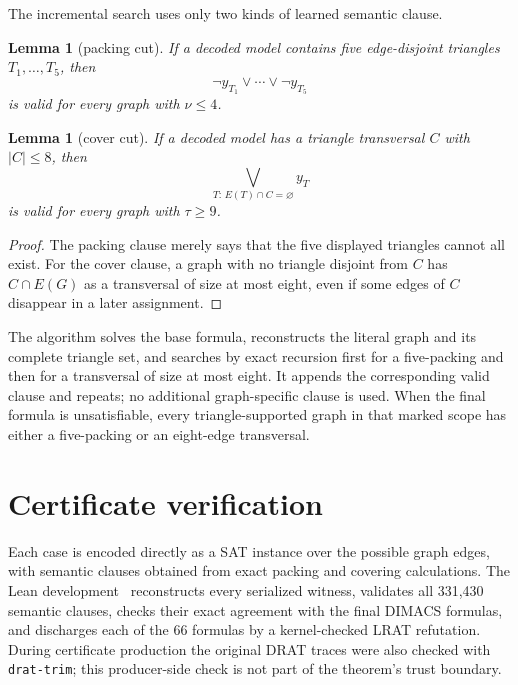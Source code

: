 \documentclass[11pt]{article}
\newtheorem{lemma}[theorem]{Lemma}
\theoremstyle{definition}
\begin{document}
The incremental search uses only two kinds of learned semantic clause.

\begin{lemma}[packing cut]\label{lem:packing-cut}
If a decoded model contains five edge-disjoint triangles
$T_1,\ldots,T_5$, then
\[
  \neg y_{T_1}\vee\cdots\vee\neg y_{T_5}
\]
is valid for every graph with $\nu\leq4$.
\end{lemma}

\begin{lemma}[cover cut]\label{lem:cover-cut}
If a decoded model has a triangle transversal $C$ with $|C|\leq8$, then
\[
  \bigvee_{T:\,E(T)\cap C=\varnothing} y_T
\]
is valid for every graph with $\tau\geq9$.
\end{lemma}

\begin{proof}
The packing clause merely says that the five displayed triangles cannot all
exist.  For the cover clause, a graph with no triangle disjoint from $C$ has
$C\cap E(G)$ as a transversal of size at most eight, even if some edges of
$C$ disappear in a later assignment.
\end{proof}

The algorithm solves the base formula, reconstructs the literal graph and its
complete triangle set, and searches by exact recursion first for a
five-packing and then for a transversal of size at most eight.  It appends the
corresponding valid clause and repeats; no additional graph-specific clause is
used.  When the final formula is unsatisfiable, every
triangle-supported graph in that marked scope has either a five-packing or an
eight-edge transversal.

\section{Certificate verification}\label{sec:computation}

Each case is encoded directly as a SAT instance over the possible graph
edges, with semantic clauses obtained from exact packing and covering
calculations.  The Lean development~\cite{Lean4,Mathlib} reconstructs every
serialized witness,
validates all 331,430 semantic clauses, checks their exact agreement with the
final DIMACS formulas, and discharges each of the 66 formulas by a
kernel-checked LRAT refutation.  During certificate production the original
DRAT traces were also checked with \texttt{drat-trim}; this producer-side check
is not part of the theorem's trust boundary.
\end{document}
